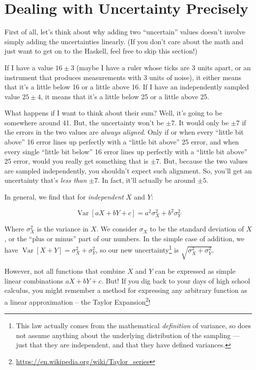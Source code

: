 \documentclass[]{article}
\renewcommand{\href}[2]{#2\footnote{\url{#1}}}
\begin{document}
\section{Dealing with Uncertainty
Precisely}\label{dealing-with-uncertainty-precisely}

First of all, let's think about why adding two ``uncertain'' values doesn't
involve simply adding the uncertainties linearly. (If you don't care about the
math and just want to get on to the Haskell, feel free to skip this section!)

If I have a value \(16 \pm 3\) (maybe I have a ruler whose ticks are 3 units
apart, or an instrument that produces measurements with 3 units of noise), it
either means that it's a little below 16 or a little above 16. If I have an
independently sampled value \(25 \pm 4\), it means that it's a little below 25
or a little above 25.

What happens if I want to think about their sum? Well, it's going to be
somewhere around 41. But, the uncertainty won't be \(\pm 7\). It would only be
\(\pm 7\) if the errors in the two values are \emph{always aligned}. Only if or
when every ``little bit above'' 16 error lines up perfectly with a ``little bit
above'' 25 error, and when every single ``little bit below'' 16 error lines up
perfectly with a ``little bit above'' 25 error, would you really get something
that is \(\pm
7\). But, because the two values are sampled independently, you shouldn't expect
such alignment. So, you'll get an uncertainty that's \emph{less than} \(\pm
7\). In fact, it'll actually be around \(\pm 5\).

In general, we find that for \emph{independent} \(X\) and \(Y\):

\[
\operatorname{Var}[aX + bY + c] = a^2 \sigma_X^2 + b^2 \sigma_Y^2
\]

Where \(\sigma_X^2\) is the variance in \(X\). We consider \(\sigma_X\) to be
the standard deviation of \(X\), or the ``plus or minus'' part of our numbers.
In the simple case of addition, we have \(\operatorname{Var}[X + Y] = \sigma_X^2
+ \sigma_Y^2\), so our new uncertainty\footnote{This law actually comes from the
  mathematical \emph{definition} of variance, so does not assume anything about
  the underlying distribution of the sampling --- just that they are
  independent, and that they have defined variances.} is
\(\sqrt{\sigma_X^2 + \sigma_Y^2}\).

However, not all functions that combine \(X\) and \(Y\) can be expressed as
simple linear combinations \(aX + bY + c\). But! If you dig back to your days of
high school calculus, you might remember a method for expressing any arbitrary
function as a linear approximation -- the
\href{https://en.wikipedia.org/wiki/Taylor_series}{Taylor Expansion}!
\end{document}
